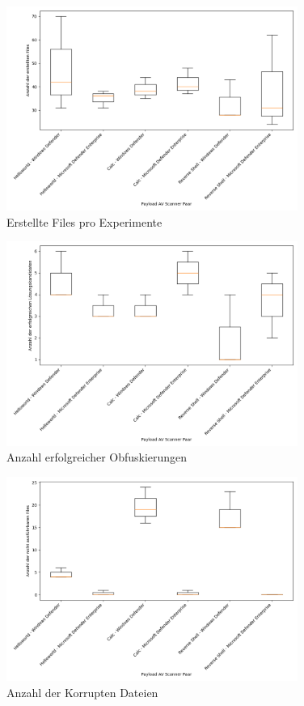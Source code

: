 \begin{figure}[h]
    \centering
    \includegraphics[width=0.85\textwidth]{gfx/Desktriptiv/files_overview.png}
    \caption{Erstellte Files pro Experimente}
    \label{fig:files_overview}
\end{figure}
\begin{figure}[h]
    \centering
    \includegraphics[width=0.85\textwidth]{gfx/Desktriptiv/evaded_overview.png}
    \caption{Anzahl erfolgreicher Obfuskierungen}
    \label{fig:evaded_overview}
\end{figure}
\begin{figure}[]
    \centering
    \includegraphics[width=0.85\textwidth]{gfx/Desktriptiv/corrupt_overview.png}
    \caption{Anzahl der Korrupten Dateien}
    \label{fig:corrupt_overview}
\end{figure}
